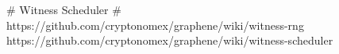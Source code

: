 # Witness Scheduler # 
https://github.com/cryptonomex/graphene/wiki/witness-rng
https://github.com/cryptonomex/graphene/wiki/witness-scheduler
